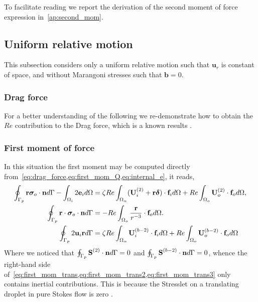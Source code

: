 To facilitate reading we report the derivation of the second moment of force expression in~\ref{ap:second_mom}. 


\subsection{Uniform relative motion}

This subsection considers only a uniform relative motion such that $\textbf{u}_r$ is constant of space, and without Marangoni stresses such that $\textbf{b}=0$.

\subsubsection{Drag force}

For a better understanding of the following we re-demonstrate how to obtain the $Re$ contribution to the Drag force, which is a known results \citep{stone2001inertial}. 


\subsubsection{First moment of force}

In this situation the first moment may be computed directly from~\ref{eq:drag_force,eq:first_mom_Q,eq:internal_e}, it reads, 
\begin{align}
    \label{eq:first_mom_trans}
    \intS[p]{\textbf{r}\bm\sigma_{o}\cdot \textbf{n}}
    - \intO[i]{2\textbf{e}_i}
    &=
    \zeta Re \intO{(\textbf{U}_{i}^{(2)} + \textbf{r}\bm\delta)\cdot \textbf{f}_{i}} 
    + Re\intO[o]{\textbf{U}_{o}^{(2)}\cdot \textbf{f}_{o}},\\
    \label{eq:first_mom_trans2}
    \intS[p]{\textbf{r} \cdot  \bm\sigma_{o}\cdot \textbf{n}}
    &=
    - Re\intO[o]{\frac{\textbf{r}}{r^{-3}}\cdot \textbf{f}_{o}}. \\
    \label{eq:first_mom_trans3}
    \intS[p]{2\textbf{u}_{i} \textbf{r}}
    &=
    \zeta Re \intO{\textbf{U}_{i}^{(b-2)}\cdot \textbf{f}_{i}} 
    + Re\intO[o]{\textbf{U}_{o}^{(b-2)}\cdot \textbf{f}_{o}}
\end{align}
Where we noticed that $\intS[p]{\textbf{S}^{(2)}\cdot \textbf{n}} = 0$ and $\intS[p]{\textbf{S}^{(b-2)}\cdot \textbf{n}} = 0$, whence the right-hand side of~\ref{eq:first_mom_trans,eq:first_mom_trans2,eq:first_mom_trans3} only contains inertial contributions. 
This is because the Stresslet on a translating droplet in pure Stokes flow is zero \citep{kim2013microhydrodynamics}. 

